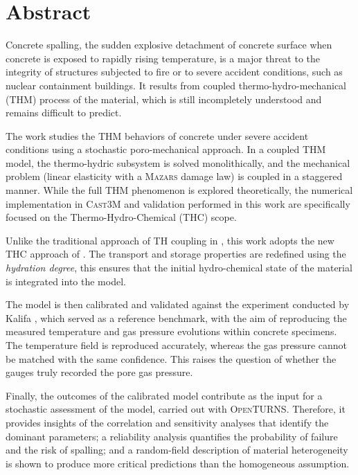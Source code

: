 \clearpage
\chapter*{Abstract}

Concrete spalling, the sudden explosive detachment of concrete surface when concrete is exposed to rapidly rising temperature, is a major threat to the integrity of structures subjected to fire or to severe accident conditions, such as nuclear containment buildings. It results from coupled thermo-hydro-mechanical (THM) process of the material, which is still incompletely understood and remains difficult to predict.

The work studies the THM behaviors of concrete under severe accident conditions using a stochastic poro-mechanical approach. In a coupled THM model, the thermo-hydric subsystem is solved monolithically, and the mechanical problem (linear elasticity with a \textsc{Mazars} damage law) is coupled in a staggered manner. While the full THM phenomenon is explored theoretically, the numerical implementation in \textsc{Cast3M} and validation performed in this work are specifically focused on the Thermo-Hydro-Chemical (THC) scope.

Unlike the traditional approach of TH coupling in \cite{dauti2018}, this work adopts the new THC approach of \cite{sciume2024}. The transport and storage properties are redefined using the \emph{hydration degree}, this ensures that the initial hydro-chemical state of the material is integrated into the model.

The model is then calibrated and validated against the experiment conducted by Kalifa \cite{kalifa2000}, which served as a reference benchmark, with the aim of reproducing the measured temperature and gas pressure evolutions within concrete specimens. The temperature field is reproduced accurately, whereas the gas pressure cannot be matched with the same confidence. This raises the question of whether the gauges truly recorded the pore gas pressure.

Finally, the outcomes of the calibrated model contribute as the input for a stochastic assessment of the model, carried out with \textsc{OpenTURNS}. Therefore, it provides insights of the correlation and sensitivity analyses that identify the dominant parameters; a reliability analysis quantifies the probability of failure and the risk of spalling; and a random-field description of material heterogeneity is shown to produce more critical predictions than the homogeneous assumption.

